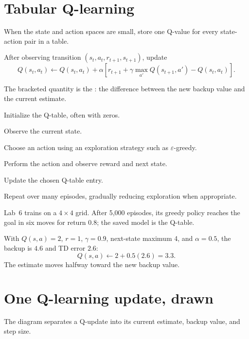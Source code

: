 \section{Tabular Q-learning}

When the state and action spaces are small, store one Q-value for every state-action pair in a table.

After observing transition $(s_t,a_t,r_{t+1},s_{t+1})$, update
\[
Q(s_t,a_t)\leftarrow Q(s_t,a_t)+\alpha\left[r_{t+1}+\gamma\max_{a'}Q(s_{t+1},a')-Q(s_t,a_t)\right].
\]

The bracketed quantity is the : the difference between the new backup value and the current estimate.

\begin{utpsteps}
  \item Initialize the Q-table, often with zeros.
  \item Observe the current state.
  \item Choose an action using an exploration strategy such as $\varepsilon$-greedy.
  \item Perform the action and observe reward and next state.
  \item Update the chosen Q-table entry.
  \item Repeat over many episodes, gradually reducing exploration when appropriate.
\end{utpsteps}

Lab~6 trains on a $4\times4$ grid. After 5,000 episodes, its greedy policy reaches the goal in six moves for return $0.8$; the saved model is the Q-table.

\begin{workedexample}
With $Q(s,a)=2$, $r=1$, $\gamma=0.9$, next-state maximum 4, and $\alpha=0.5$, the backup is $4.6$ and TD error $2.6$:
\[
Q(s,a)\leftarrow2+0.5(2.6)=3.3.
\]
The estimate moves halfway toward the new backup value.
\end{workedexample}

\section{One Q-learning update, drawn}

The diagram separates a Q-update into its current estimate, backup value, and step size.

